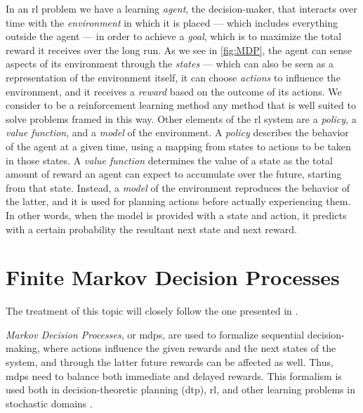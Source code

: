 In an \acrshort{rl} problem we have a learning \emph{agent}, the decision-maker, that interacts over time with the \emph{environment} in which it is placed --- which includes everything outside the agent --- in order to achieve a \emph{goal}, which is to maximize the total reward it receives over the long run. As we see in \autoref{fig:MDP}, the agent can sense aspects of its environment through the \emph{states} --- which can also be seen as a representation of the environment itself, it can choose \emph{actions} to influence the environment, and it receives a \emph{reward} based on the outcome of its actions. We consider to be a reinforcement learning method any method that is well suited to solve problems framed in this way. Other elements of the \acrshort{rl} system are a \emph{policy}, a \emph{value function}, and a \emph{model} of the environment. A \emph{policy} describes the behavior of the agent at a given time, using a mapping from states to actions to be taken in those states. A \emph{value function} determines the value of a state as the total amount of reward an agent can expect to accumulate over the future, starting from that state. Instead, a \emph{model} of the environment reproduces the behavior of the latter, and it is used for planning actions before actually experiencing them. In other words, when the model is provided with a state and action, it predicts with a certain probability the resultant next state and next reward.


\section{Finite Markov Decision Processes}

The treatment of this topic will closely follow the one presented in \cite{SuttonBarto}.

\emph{Markov Decision Processes}, or \acrshort{mdp}s, are used to formalize sequential decision-making, where actions influence the given rewards and the next states of the system, and through the latter future rewards can be affected as well. Thus, \acrshort{mdp}s need to balance both immediate and delayed rewards. This formalism is used both in decision-theoretic planning (\acrshort{dtp}), \acrshort{rl}, and other learning problems in stochastic domains \cite{WierOtter12RLStateOfTheArt}.

